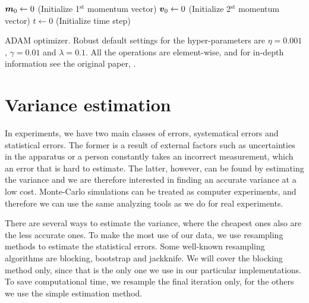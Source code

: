 \begin{algorithm}
	\SetAlgoLined
	\Parameter{$\gamma_1,\gamma_2\in [0,1)$: Momentum parameters}
	
	$\boldsymbol{{m}}_0\leftarrow 0$ (Initialize 1$^{\text{st}}$ momentum vector)\;
	$\boldsymbol{{v}}_0\leftarrow 0$ (Initialize 2$^{\text{st}}$ momentum vector)\;
	$t\leftarrow 0$ (Initialize time step)\;
	\caption{ADAM optimizer. Robust default settings for the hyper-parameters are $\eta=0.001$, $\gamma=0.01$ and $\lambda=0.1$. All the operations are element-wise, and for in-depth information see the original paper, \cite{kingma_adam:_2014}.}
	\label{alg:adam}
\end{algorithm}

\section{Variance estimation}
In experiments, we have two main classes of errors, systematical errors and statistical errors. The former is a result of external factors such as uncertainties in the apparatus or a person constantly takes an incorrect measurement, which an error that is hard to estimate. The latter, however, can be found by estimating the variance and we are therefore interested in finding an accurate variance at a low cost. Monte-Carlo simulations can be treated as computer experiments, and therefore we can use the same analyzing tools as we do for real experiments. 

There are several ways to estimate the variance, where the cheapest ones also are the less accurate ones. To make the most use of our data, we use resampling methods to estimate the statistical errors. Some well-known resampling algorithms are blocking, bootstrap and jackknife. We will cover the blocking method only, since that is the only one we use in our particular implementations. To save computational time, we resample the final iteration only, for the others we use the simple estimation method.

